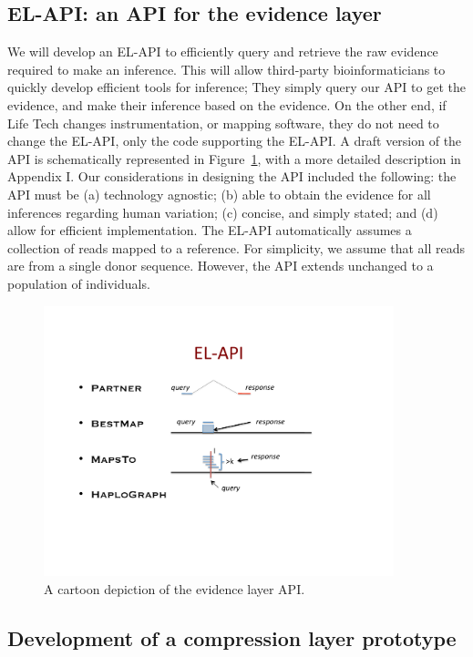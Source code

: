 \documentclass[10pt]{article}
\begin{document}
\subsection{EL-API: an API for the evidence layer}
\label{sec:el_api}
We will develop an EL-API to efficiently query and retrieve the raw
evidence required to make an inference. This will allow third-party
bioinformaticians to quickly develop efficient tools for inference;
They simply query our API to get the evidence, and make their
inference based on the evidence. On the other end, if Life Tech
changes instrumentation, or mapping software, they do not need to
change the EL-API, only the code supporting the EL-API.  A draft
version of the API is schematically represented in
Figure~\ref{fig:el_api}, with a more detailed description in Appendix
I. Our considerations in designing the API included the following: the
API must be (a) technology agnostic; (b) able to obtain the evidence
for all inferences regarding human variation; (c) concise, and simply
stated; and (d) allow for efficient implementation. The EL-API
automatically assumes a collection of reads mapped to a reference. For
simplicity, we assume that all reads are from a single donor
sequence. However, the API extends unchanged to a population of
individuals.
\begin{figure}[ht]
  \centering
  \includegraphics[trim = 25mm 50mm 40mm 20mm, clip, width=4in]{fig/ELAPI.pdf}
  \caption{A cartoon depiction of the evidence layer API.}
  \label{fig:el_api}
\end{figure}

\subsection{Development of a compression layer prototype}
\end{document}

